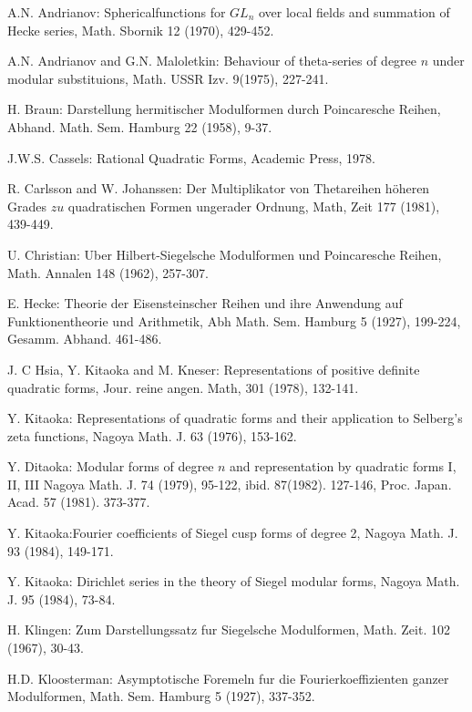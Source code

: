 \begin{thebibliography}{99}
 A.N. Andrianov: Spherical\pageoriginale functions for
$GL_n$ over local fields and summation of Hecke series, Math. Sbornik
12 (1970), 429-452.

 A.N. Andrianov and G.N. Maloletkin: Behaviour of
theta-series of degree $n$ under modular substituions, Math. USSR
Izv. 9(1975), 227-241.

 H. Braun: Darstellung hermitischer Modulformen durch
Poincaresche Reihen, Abhand. Math. Sem. Hamburg 22 (1958), 9-37.

 J.W.S. Cassels: Rational Quadratic Forms, Academic
Press, 1978.

 R. Carlsson and W. Johanssen: Der Multiplikator von
Thetareihen h\"oheren Grades $zu$ quadratischen Formen ungerader
Ordnung, Math, Zeit 177 (1981), 439-449.

 U. Christian: Uber Hilbert-Siegelsche Modulformen und
Poincaresche Reihen, Math. Annalen 148 (1962), 257-307.

 E. Hecke: Theorie der Eisensteinscher Reihen und ihre
Anwendung auf Funktionentheorie und Arithmetik, Abh Math. Sem. Hamburg
5 (1927), 199-224, Gesamm. Abhand. 461-486. 

 J. C Hsia, Y. Kitaoka and M. Kneser: Representations
of positive definite quadratic forms, Jour. reine angen. Math, 301
(1978), 132-141.

 Y. Kitaoka: Representations of quadratic forms and
their application to Selberg's zeta functions, Nagoya Math. J. 63
(1976), 153-162.


 Y. Ditaoka: Modular forms of degree $n$ and
representation by quadratic forms I, II, III Nagoya Math. J. 74
(1979), 95-122, ibid. 87(1982). 127-146, Proc. Japan. Acad. 57
(1981). 373-377. 

 Y. Kitaoka:\pageoriginale Fourier coefficients of
Siegel cusp forms of degree 2, Nagoya Math. J. 93 (1984), 149-171. 

 Y. Kitaoka: Dirichlet series in the theory of Siegel
modular forms, Nagoya Math. J. 95 (1984), 73-84.

 H. Klingen: Zum Darstellungssatz fur Siegelsche
Modulformen, Math. Zeit. 102 (1967), 30-43.

 H.D. Kloosterman: Asymptotische Foremeln fur die
Fourierkoeffizienten ganzer Modulformen, Math. Sem. Hamburg 5 (1927),
337-352. 


\end{thebibliography}

